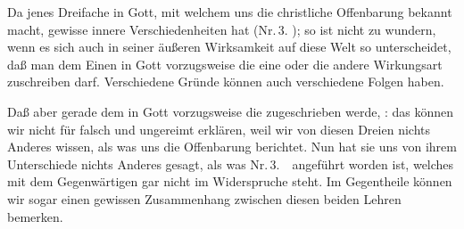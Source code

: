 \begin{aufza}
\item Da jenes Dreifache in Gott, mit welchem uns die christliche Offenbarung bekannt macht, gewisse innere Ver\-schie\-den\-hei\-ten hat (Nr.\,3. ); so ist nicht zu wundern, wenn es sich auch in seiner äußeren Wirksamkeit auf diese Welt so unterscheidet, daß man dem Einen in Gott vorzugsweise die eine oder die andere Wirkungsart zuschreiben darf. Verschiedene Gründe können auch verschiedene Folgen haben.
\item Daß aber gerade dem  in Gott vorzugsweise die  zugeschrieben werde, \usw : das können wir nicht für falsch und ungereimt erklären, weil wir von diesen Dreien nichts Anderes wissen, als was uns die Offenbarung berichtet. Nun hat sie uns von ihrem Unterschiede nichts Anderes gesagt, als was Nr.\,3.\ \ angeführt worden ist, welches mit dem Gegenwärtigen gar nicht im Widerspruche steht. Im Gegentheile können wir sogar einen gewissen Zusammenhang zwischen diesen beiden Lehren bemerken.
\begin{aufzb}

\end{aufzb}
\end{aufza}
